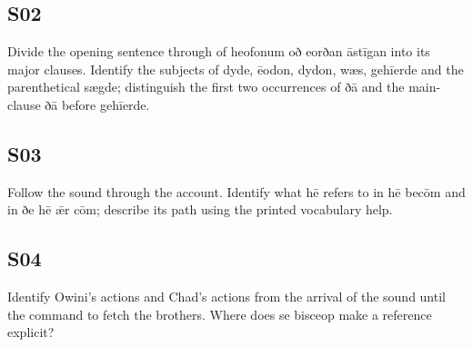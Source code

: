 \par\begin{minipage}{\linewidth}\raggedright
\subsection*{S02}

Divide the opening sentence through of heofonum oð eorðan āstīgan into its major clauses. Identify the subjects of dyde, ēodon, dydon, wæs, gehīerde and the parenthetical sægde; distinguish the first two occurrences of ðā and the main-clause ðā before gehīerde.

\end{minipage}\par\addvspace{4pt}

\par\begin{minipage}{\linewidth}\raggedright
\subsection*{S03}

Follow the sound through the account. Identify what hē refers to in hē becōm and in ðe hē ǣr cōm; describe its path using the printed vocabulary help.

\end{minipage}\par\addvspace{4pt}

\par\begin{minipage}{\linewidth}\raggedright
\subsection*{S04}

Identify Owini’s actions and Chad’s actions from the arrival of the sound until the command to fetch the brothers. Where does se bisceop make a reference explicit?

\end{minipage}\par\addvspace{4pt}

